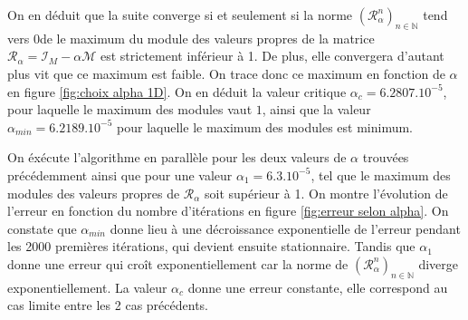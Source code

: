 \documentclass[12pt]{report}
\begin{document}
On en déduit que la suite converge si et seulement si la norme $(\mathcal{R}_\alpha ^n)_{n\in \mathbb{N}}$ tend vers 0de le maximum du module des valeurs propres de la matrice
$\mathcal{R}_\alpha = \mathcal{I}_M - \alpha \mathcal{M}$ est strictement inférieur à 1. De plus, elle convergera
d'autant plus vit que ce maximum est faible.
On trace donc ce maximum en fonction de $\alpha$ en figure \ref{fig:choix alpha 1D}. 
On en déduit la valeur critique $\alpha_c = 6.2807.10^{-5}$, pour laquelle le maximum des modules vaut $1$, ainsi que la 
valeur $\alpha_{min} = 6.2189.10^{-5}$ pour laquelle le maximum des modules est minimum.

On éxécute l'algorithme en parallèle pour les deux valeurs de $\alpha$ trouvées précédemment ainsi que pour une valeur 
$\alpha_1 = 6.3.10^{-5}$, tel que le maximum des modules des valeurs propres de $\mathcal{R}_\alpha$ soit supérieur à 1.
On montre l'évolution de l'erreur en fonction du nombre d'itérations en figure \ref{fig:erreur selon alpha}. On constate 
que $\alpha_{min}$ donne lieu à une décroissance exponentielle de l'erreur pendant les 2000 premières itérations, qui 
devient ensuite stationnaire. Tandis que $\alpha_1$ donne une erreur qui croît exponentiellement car la norme de 
$(\mathcal{R}_\alpha ^n)_{n\in \mathbb{N}}$ diverge exponentiellement. La valeur $\alpha_c$ donne une erreur constante, 
elle correspond au cas limite entre les 2 cas précédents.
\end{document}

